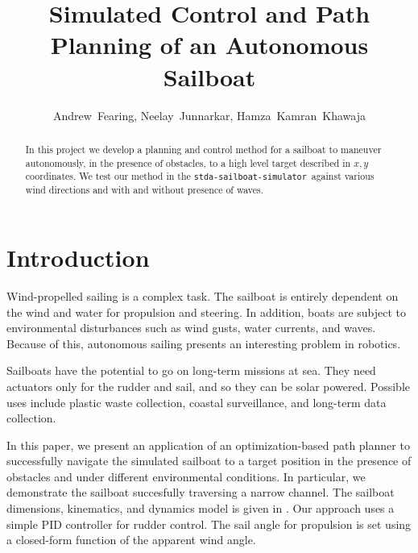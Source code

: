 \documentclass[conference]{IEEEtran}
\newcommand{\Sim}{\lstinline{stda-sailboat-simulator}\ }
\begin{document}
\title{Simulated Control and Path Planning of an Autonomous Sailboat}
\author{Andrew~Fearing, Neelay~Junnarkar,  Hamza~Kamran~Khawaja}
\maketitle


\begin{abstract}
In this project we develop a planning and control method for a sailboat to maneuver autonomously, in the presence of obstacles, to a high level target described in \(x, y\) coordinates. We test our method in the \Sim against various wind directions and with and without presence of waves. 
\end{abstract}


\section{Introduction}
Wind-propelled sailing is a complex task. The sailboat is entirely dependent on the wind and water for propulsion and steering. In addition, boats are subject to environmental disturbances such as wind gusts, water currents, and waves. Because of this, autonomous sailing presents an interesting problem in robotics.

Sailboats have the potential to go on long-term missions at sea. They need actuators only for the rudder and sail, and so they can be solar powered. Possible uses include plastic waste collection, coastal surveillance, and long-term data collection.

In this paper, we present an application of an optimization-based path planner to successfully navigate the simulated sailboat to a target position in the presence of obstacles and under different environmental conditions. In particular, we demonstrate the sailboat succesfully traversing a narrow channel. The sailboat dimensions, kinematics, and dynamics model is given in \cite{Buehler2018}. Our approach uses a simple PID controller for rudder control. The sail angle for propulsion is set using a closed-form function of the apparent wind angle.

\end{document}

